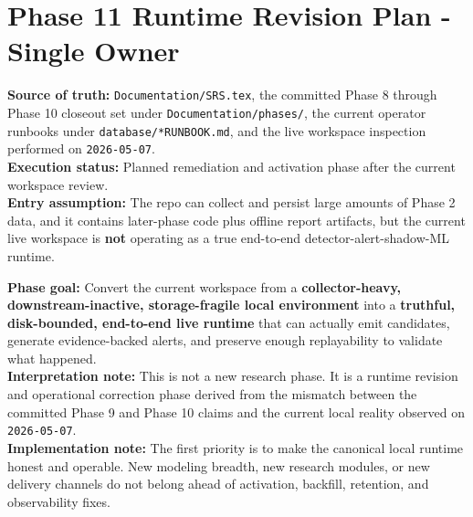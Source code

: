 \documentclass{article}
\begin{document}
\section*{Phase 11 Runtime Revision Plan - Single Owner}

\textbf{Source of truth:} \texttt{Documentation/SRS.tex}, the committed Phase 8 through Phase 10 closeout set under \texttt{Documentation/phases/}, the current operator runbooks under \texttt{database/*RUNBOOK.md}, and the live workspace inspection performed on \texttt{2026-05-07}.\\
\textbf{Execution status:} Planned remediation and activation phase after the current workspace review.\\
\textbf{Entry assumption:} The repo can collect and persist large amounts of Phase 2 data, and it contains later-phase code plus offline report artifacts, but the current live workspace is \textbf{not} operating as a true end-to-end detector-alert-shadow-ML runtime.

\textbf{Phase goal:} Convert the current workspace from a \textbf{collector-heavy, downstream-inactive, storage-fragile local environment} into a \textbf{truthful, disk-bounded, end-to-end live runtime} that can actually emit candidates, generate evidence-backed alerts, and preserve enough replayability to validate what happened.\\
\textbf{Interpretation note:} This is not a new research phase. It is a runtime revision and operational correction phase derived from the mismatch between the committed Phase 9 and Phase 10 claims and the current local reality observed on \texttt{2026-05-07}.\\
\textbf{Implementation note:} The first priority is to make the canonical local runtime honest and operable. New modeling breadth, new research modules, or new delivery channels do not belong ahead of activation, backfill, retention, and observability fixes.
\end{document}
